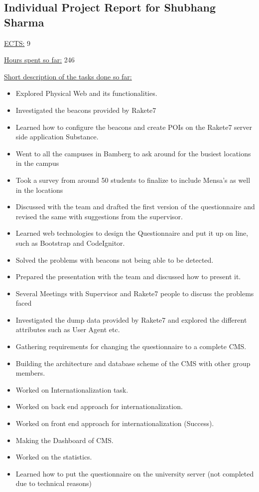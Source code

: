 \subsection{Individual Project Report for Shubhang Sharma}
\par \underline{ECTS:} 9
\par \underline{Hours spent so far:} 246
\par \underline{Short description of the tasks done so far:}
\begin{itemize}
	\item Explored Physical Web and its functionalities.
	\item Investigated the beacons provided by Rakete7
	\item Learned how to configure the beacons and create POIs on the Rakete7 server side application Substance.
	\item Went to all the campuses in Bamberg to ask around for the busiest locations in the campus
	\item Took a survey from around 50 students to finalize to include Mensa’s as well in the locations
	\item Discussed with the team and drafted the first version of the questionnaire and revised the same with suggestions from the supervisor.
	\item Learned web technologies to design the Questionnaire and put it up on line, such as Bootstrap and CodeIgnitor.
	\item Solved the problems with beacons not being able to be detected.
	\item Prepared the presentation with the team and discussed how to present it.
	\item Several Meetings with Supervisor and Rakete7 people to discuss the problems faced
	\item Investigated the dump data provided by Rakete7 and explored the different attributes such as User Agent etc.
	\item Gathering requirements for changing the questionnaire to a complete CMS.
	\item Building the architecture and database scheme of the CMS with other group members.
	\item Worked on Internationalization task.
	\item Worked on back end approach for internationalization.
	\item Worked on front end approach for internationalization (Success).
	\item Making the Dashboard of CMS.
	\item Worked on the statistics.
	\item Learned how to put the questionnaire on the university server (not completed due to technical reasons)
\end{itemize}

